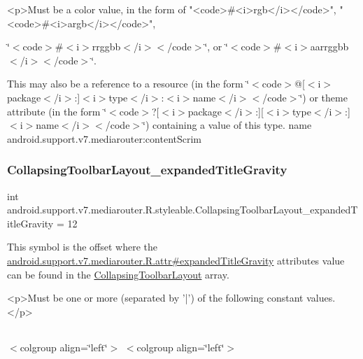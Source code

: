 \begin{DoxyVerb}      <p>Must be a color value, in the form of "<code>#<i>rgb</i></code>", "<code>#<i>argb</i></code>",
\end{DoxyVerb}
 \char`\"{}$<$code$>$\#$<$i$>$rrggbb$<$/i$>$$<$/code$>$\char`\"{}, or \char`\"{}$<$code$>$\#$<$i$>$aarrggbb$<$/i$>$$<$/code$>$\char`\"{}. 

This may also be a reference to a resource (in the form \char`\"{}$<$code$>$@\mbox{[}$<$i$>$package$<$/i$>$\+:\mbox{]}$<$i$>$type$<$/i$>$\+:$<$i$>$name$<$/i$>$$<$/code$>$\char`\"{}) or theme attribute (in the form \char`\"{}$<$code$>$?\mbox{[}$<$i$>$package$<$/i$>$\+:\mbox{]}\mbox{[}$<$i$>$type$<$/i$>$\+:\mbox{]}$<$i$>$name$<$/i$>$$<$/code$>$\char`\"{}) containing a value of this type.  name android.\+support.\+v7.\+mediarouter\+:content\+Scrim \mbox{\label{classandroid_1_1support_1_1v7_1_1mediarouter_1_1R_1_1styleable_ae40ceb21ca3985d085331f3239b64f89}} 
\subsubsection{\texorpdfstring{Collapsing\+Toolbar\+Layout\+\_\+expanded\+Title\+Gravity}{CollapsingToolbarLayout\_expandedTitleGravity}}
{\footnotesize\ttfamily int android.\+support.\+v7.\+mediarouter.\+R.\+styleable.\+Collapsing\+Toolbar\+Layout\+\_\+expanded\+Title\+Gravity = 12\hspace{0.3cm}{\ttfamily [static]}}

This symbol is the offset where the \hyperlink{classandroid_1_1support_1_1v7_1_1mediarouter_1_1R_1_1attr_a5381034a891461ad50ed45590ebf8679}{android.\+support.\+v7.\+mediarouter.\+R.\+attr\#expanded\+Title\+Gravity} attribute\textquotesingle{}s value can be found in the \hyperlink{classandroid_1_1support_1_1v7_1_1mediarouter_1_1R_1_1styleable_aae2cb4975e9b9a19d129888f497cc386}{Collapsing\+Toolbar\+Layout} array.

\begin{DoxyVerb}      <p>Must be one or more (separated by '|') of the following constant values.</p>
\end{DoxyVerb}
 \tabulinesep=1mm
\begin{longtabu} spread 0pt [c]{*{0}{|X[-1]}|}
\hline
\end{longtabu}
$<$colgroup align=\char`\"{}left\char`\"{}$>$ $<$colgroup align=\char`\"{}left\char`\"{}$>$ 

